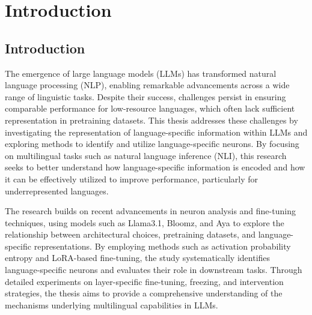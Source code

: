 
\chapter{Introduction}\singlespacing %

\label{Chapter1} %


\section{Introduction}

The emergence of large language models (LLMs) has transformed natural language processing (NLP), enabling remarkable advancements across a wide range of linguistic tasks. Despite their success, challenges persist in ensuring comparable performance for low-resource languages, which often lack sufficient representation in pretraining datasets. This thesis addresses these challenges by investigating the representation of language-specific information within LLMs and exploring methods to identify and utilize language-specific neurons. By focusing on multilingual tasks such as natural language inference (NLI), this research seeks to better understand how language-specific information is encoded and how it can be effectively utilized to improve performance, particularly for underrepresented languages.

The research builds on recent advancements in neuron analysis and fine-tuning techniques, using models such as Llama3.1, Bloomz, and Aya to explore the relationship between architectural choices, pretraining datasets, and language-specific representations. By employing methods such as activation probability entropy and LoRA-based fine-tuning, the study systematically identifies language-specific neurons and evaluates their role in downstream tasks. Through detailed experiments on layer-specific fine-tuning, freezing, and intervention strategies, the thesis aims to provide a comprehensive understanding of the mechanisms underlying multilingual capabilities in LLMs.

